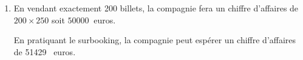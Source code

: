 \documentclass[10pt]{article}
\providecommand{\euro}{\texteuro}
\providecommand{\np}[2][]{{#2~#1}}
\providecommand{\euro}{{\text{€}}}
\renewcommand{\euro}{\ifmmode\text{\texteuro}\else\texteuro\fi}
\begin{document}
\begin{enumerate}
\begin{enumerate}
On a E$(C) = \np{51500} \times \np{0,94775} + \ldots \np{46400} \times \np{0,00003} \approx \np{51429,2}$, soit \np{51429}~\euro{} à l'euro près

		\item 
En vendant exactement 200 billets, la compagnie fera un chiffre d'affaires de $200\times 250$ soit $\np{50000}$ euros.

En pratiquant le surbooking, la compagnie peut espérer un chiffre d'affaires de \np{51429} euros.
	\end{enumerate}
\end{enumerate}

\bigskip
\end{document}
